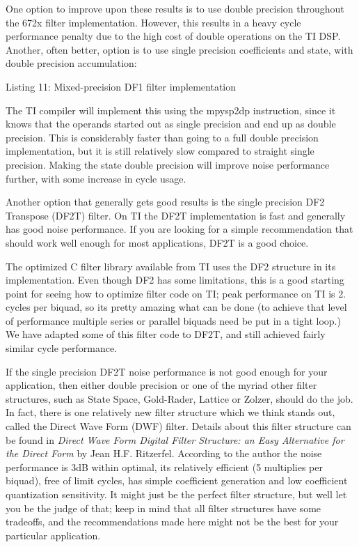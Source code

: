 One option to improve upon these results is to use double precision throughout the 672x filter implementation. However, this results in a heavy cycle performance penalty due to the high cost of double operations on the TI D\+SP. Another, often better, option is to use single precision coefficients and state, with double precision accumulation\+:


\begin{DoxyCode}{0}
\end{DoxyCode}
  Listing 11\+: Mixed-\/precision D\+F1 filter implementation

The TI compiler will implement this using the mpysp2dp instruction, since it knows that the operands started out as single precision and end up as double precision. This is considerably faster than going to a full double precision implementation, but it is still relatively slow compared to straight single precision. Making the state double precision will improve noise performance further, with some increase in cycle usage.

Another option that generally gets good results is the single precision D\+F2 Transpose (D\+F2T) filter. On TI the D\+F2T implementation is fast and generally has good noise performance. If you are looking for a simple recommendation that should work well enough for most applications, D\+F2T is a good choice.

The optimized C filter library available from TI uses the D\+F2 structure in its implementation. Even though D\+F2 has some limitations, this is a good starting point for seeing how to optimize filter code on TI; peak performance on TI is 2. cycles per biquad, so it\textquotesingle{}s pretty amazing what can be done (to achieve that level of performance multiple series or parallel biquads need be put in a tight loop.) We have adapted some of this filter code to D\+F2T, and still achieved fairly similar cycle performance.

If the single precision D\+F2T noise performance is not good enough for your application, then either double precision or one of the myriad other filter structures, such as State Space, Gold-\/\+Rader, Lattice or Zolzer, should do the job. In fact, there is one relatively new filter structure which we think stands out, called the Direct Wave Form (D\+WF) filter. Details about this filter structure can be found in {\itshape  Direct Wave Form Digital Filter Structure\+: an Easy Alternative for the Direct Form} by Jean H.\+F. Ritzerfel. According to the author the noise performance is 3dB within optimal, it\textquotesingle{}s relatively efficient (5 multiplies per biquad), free of limit cycles, has simple coefficient generation and low coefficient quantization sensitivity. It might just be the perfect filter structure, but we\textquotesingle{}ll let you be the judge of that; keep in mind that all filter structures have some tradeoffs, and the recommendations made here might not be the best for your particular application.

